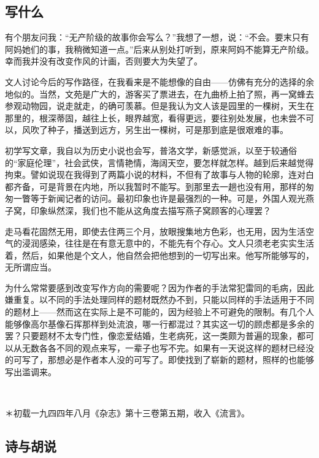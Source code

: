 \subsection{写什么}

\par 有个朋友问我：“无产阶级的故事你会写么？”我想了一想，说：“不会。要末只有阿妈她们的事，我稍微知道一点。”后来从别处打听到，原来阿妈不能算无产阶级。幸而我并没有改变作风的计画，否则要大为失望了。
\par 文人讨论今后的写作路径，在我看来是不能想像的自由——仿佛有充分的选择的余地似的。当然，文苑是广大的，游客买了票进去，在九曲桥上拍了照，再一窝蜂去参观动物园，说走就走，的确可羡慕。但是我认为文人该是园里的一棵树，天生在那里的，根深蒂固，越往上长，眼界越宽，看得更远，要往别处发展，也未尝不可以，风吹了种子，播送到远方，另生出一棵树，可是那到底是很艰难的事。
\par 初学写文章，我自以为历史小说也会写，普洛文学，新感觉派，以至于较通俗的“家庭伦理”，社会武侠，言情艳情，海阔天空，要怎样就怎样。越到后来越觉得拘束。譬如说现在我得到了两篇小说的材料，不但有了故事与人物的轮廓，连对白都齐备，可是背景在内地，所以我暂时不能写。到那里去一趟也没有用，那样的匆匆一瞥等于新闻记者的访问。最初印象也许是最强烈的一种。可是，外国人观光燕子窝，印象纵然深，我们也不能从这角度去描写燕子窝顾客的心理罢？
\par 走马看花固然无用，即使去住两三个月，放眼搜集地方色彩，也无用，因为生活空气的浸润感染，往往是在有意无意中的，不能先有个存心。文人只须老老实实生活着，然后，如果他是个文人，他自然会把他想到的一切写出来。他写所能够写的，无所谓应当。
\par 为什么常常要感到改变写作方向的需要呢？因为作者的手法常犯雷同的毛病，因此嫌重复。以不同的手法处理同样的题材既然办不到，只能以同样的手法适用于不同的题材上——然而这在实际上是不可能的，因为经验上不可避免的限制。有几个人能够像高尔基像石挥那样到处流浪，哪一行都混过？其实这一切的顾虑都是多余的罢？只要题材不太专门性，像恋爱结婚，生老病死，这一类颇为普遍的现象，都可以从无数各各不同的观点来写，一辈子也写不完。如果有一天说这样的题材已经没的可写了，那想必是作者本人没的可写了。即使找到了崭新的题材，照样的也能够写出滥调来。
\par  
\par ＊初载一九四四年八月《杂志》第十三卷第五期，收入《流言》。


\subsection{诗与胡说}

